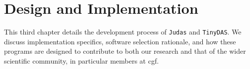 \chapter{Design and Implementation}
\label{chap:method}

This third chapter details the development process of \texttt{Judas} and \texttt{TinyDAS}. We discuss implementation specifics, software selection rationale, and how these programs are designed to contribute to both our research and that of the wider scientific community, in particular members at \acrshort{cgf}.





% 



